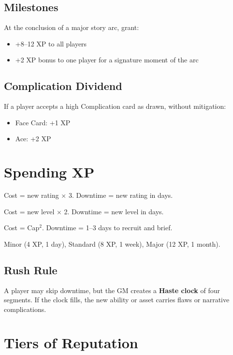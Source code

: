 \documentclass[12pt]{book}
\begin{document}
\subsection*{Milestones}
At the conclusion of a major story arc, grant:
\begin{itemize}
  \item +8--12 XP to all players  
  \item +2 XP bonus to one player for a signature moment of the arc  
\end{itemize}

\subsection*{Complication Dividend}
If a player accepts a high Complication card as drawn, without mitigation:
\begin{itemize}
  \item Face Card: +1 XP  
  \item Ace: +2 XP  
\end{itemize}

\section{Spending XP}

\begin{description}[leftmargin=2cm]
  \item[Attributes:] Cost = new rating $\times$ 3.  
  Downtime = new rating in days.  
  \item[Skills:] Cost = new level $\times$ 2.  
  Downtime = new level in days.  
  \item[On-Screen Followers:] Cost = Cap$^2$.  
  Downtime = 1--3 days to recruit and brief.  
  \item[Off-Screen Assets:] Minor (4 XP, 1 day), Standard (8 XP, 1 week), Major (12 XP, 1 month).  
\end{description}

\subsection*{Rush Rule}
A player may skip downtime, but the GM creates a \textbf{Haste clock} of four segments.  
If the clock fills, the new ability or asset carries flaws or narrative complications.

\section{Tiers of Reputation}
\end{document}
